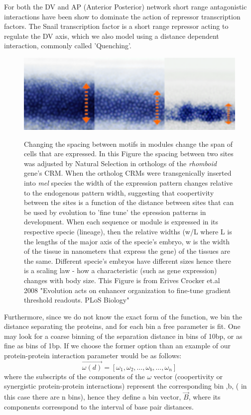 For both the DV and AP (Anterior Posterior) network short range antagonistic interactions have been show to dominate the action of repressor transcription factors\cite{pmid20087339}.  The Snail transcription factor is a short range repressor acting to regulate the DV axis, which we also model using a distance dependent interaction, commonly called 'Quenching'\cite{pmid20087339}.
\begin{figure}
  \includegraphics[width=1\textwidth]{rhoNEEs}\\
  \caption{ Changing the spacing between motifs in modules change the span of cells that are expressed.  In this Figure the spacing between two sites was adjusted by Natural Selection in orthologs of the \textit{rhomboid} gene's CRM. When the ortholog CRMs were transgenically inserted into \textit{mel} species the width of the expression pattern changes relative to the endogenous pattern width, suggesting that coopertivity between the sites is a function of the distance between sites that can be used by evolution to 'fine tune' the epression patterns in development.  When each sequence or module is expressed in its respective specie (lineage), then the relative widths (w/L where L is the lengths of the major axis of the specie's embryo, w is the width of the tissue in nanometers that express the gene) of the tissues are the same.  Different specie's embryos have different sizes hence there is a scaling law - how a characteristic (such as gene expression) changes with body size.  This Figure is from Erives Crocker et.al 2008 "Evolution acts on enhancer organization to fine-tune gradient threshold readouts. PLoS Biology"}\label{rhoNEEs}
\end{figure}

  Furthermore, since we do not know the exact form of the function, we bin the distance separating the proteins, and for each bin a free parameter is fit.  One may look for a coarse binning of the separation distance in bins of 10bp, or as fine as bins of 1bp.  If we choose the former option than an example of our protein-protein interaction parameter would be as follows:
\begin{equation}\label{}
   \overrightarrow{ \omega(d)} =  [ \omega_1 ,\omega_2 ,\ldots, \omega_b,\ldots,  \omega_n ]
\end{equation}
where the subscripts of the components of the $\omega$ vector (coopertivity or synergistic protein-protein interactions)  represent the corresponding bin ,b, ( in this case there are n bins), hence they define a bin vector, $\overrightarrow{B}$, where its components corresspond to the interval of base pair distances.


